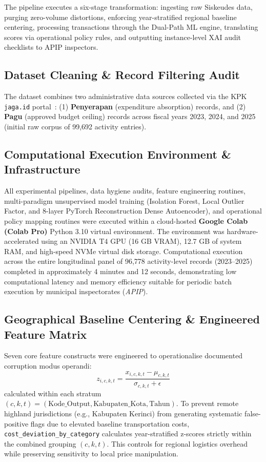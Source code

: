 \documentclass[runningheads]{llncs}
\begin{document}
The pipeline executes a six-stage transformation: ingesting raw Siskeudes data, purging zero-volume distortions, enforcing year-stratified regional baseline centering, processing transactions through the Dual-Path ML engine, translating scores via operational policy rules, and outputting instance-level XAI audit checklists to APIP inspectors.

\subsection{Dataset Cleaning \& Record Filtering Audit}
The dataset combines two administrative data sources collected via the KPK \texttt{jaga.id} portal~\cite{ref26}: (1) \textbf{Penyerapan} (expenditure absorption) records, and (2) \textbf{Pagu} (approved budget ceiling) records across fiscal years 2023, 2024, and 2025 (initial raw corpus of 99,692 activity entries).

\subsection{Computational Execution Environment \& Infrastructure}
All experimental pipelines, data hygiene audits, feature engineering routines, multi-paradigm unsupervised model training (Isolation Forest, Local Outlier Factor, and 8-layer PyTorch Reconstruction Dense Autoencoder), and operational policy mapping routines were executed within a cloud-hosted \textbf{Google Colab (Colab Pro)} Python 3.10 virtual environment. The environment was hardware-accelerated using an NVIDIA T4 GPU (16 GB VRAM), 12.7 GB of system RAM, and high-speed NVMe virtual disk storage. Computational execution across the entire longitudinal panel of 96,778 activity-level records (2023--2025) completed in approximately 4 minutes and 12 seconds, demonstrating low computational latency and memory efficiency suitable for periodic batch execution by municipal inspectorates (\textit{APIP}).

\subsection{Geographical Baseline Centering \& Engineered Feature Matrix}
Seven core feature constructs were engineered to operationalise documented corruption modus operandi:
\begin{equation}
z_{i,c,k,t} = \frac{x_{i,c,k,t} - \mu_{c,k,t}}{\sigma_{c,k,t} + \epsilon}
\end{equation}
calculated within each stratum $(c, k, t) = (\text{Kode\_Output}, \text{Kabupaten\_Kota}, \text{Tahun})$. To prevent remote highland jurisdictions (e.g., Kabupaten Kerinci) from generating systematic false-positive flags due to elevated baseline transportation costs, \texttt{cost\_deviation\_by\_category} calculates year-stratified z-scores strictly within the combined grouping $(c, k, t)$. This controls for regional logistics overhead while preserving sensitivity to local price manipulation.
\end{document}
